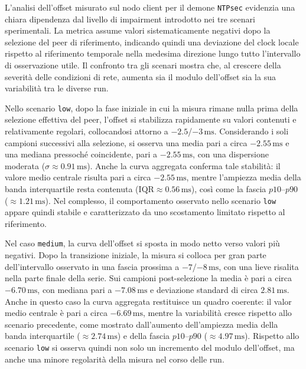 L’analisi dell’offset misurato sul nodo client per il demone \texttt{NTPsec} evidenzia
una chiara dipendenza dal livello di impairment introdotto nei tre scenari sperimentali.
La metrica assume valori sistematicamente negativi dopo la selezione del peer di
riferimento, indicando quindi una deviazione del clock locale rispetto al riferimento
temporale nella medesima direzione lungo tutto l’intervallo di osservazione utile.
Il confronto tra gli scenari mostra che, al crescere della severità delle condizioni
di rete, aumenta sia il modulo dell’offset sia la sua variabilità tra le diverse
run.

Nello scenario \texttt{low}, dopo la fase iniziale in cui la misura rimane nulla
prima della selezione effettiva del peer, l’offset si stabilizza rapidamente su valori
contenuti e relativamente regolari, collocandosi attorno a $-2.5$/$-3\,\mathrm{ms}$.
Considerando i soli campioni successivi alla selezione, si osserva una media
pari a circa $-2.55\,\mathrm{ms}$ e una mediana pressoché coincidente, pari a $-2
.55\,\mathrm{ms}$, con una dispersione moderata ($\sigma \approx 0.91\,\mathrm{ms}$).
Anche la curva aggregata conferma tale stabilità: il valore medio centrale
risulta pari a circa $-2.55\,\mathrm{ms}$, mentre l’ampiezza media della banda interquartile
resta contenuta ($\mathrm{IQR}\approx 0.56\,\mathrm{ms}$), così come la fascia
$p10$--$p90$ ($\approx 1.21\,\mathrm{ms}$). Nel complesso, il comportamento osservato
nello scenario \texttt{low} appare quindi stabile e caratterizzato da uno
scostamento limitato rispetto al riferimento.

Nel caso \texttt{medium}, la curva dell’offset si sposta in modo netto verso
valori più negativi. Dopo la transizione iniziale, la misura si colloca per gran
parte dell’intervallo osservato in una fascia prossima a $-7$/$-8\,\mathrm{ms}$, con
una lieve risalita nella parte finale della serie. Sui campioni post-selezione
la media è pari a circa $-6.70\,\mathrm{ms}$, con mediana pari a $-7.08\,\mathrm{ms}$
e deviazione standard di circa $2.81\,\mathrm{ms}$. Anche in questo caso la
curva aggregata restituisce un quadro coerente: il valor medio centrale è pari a circa
$-6.69\,\mathrm{ms}$, mentre la variabilità cresce rispetto allo scenario
precedente, come mostrato dall’aumento dell’ampiezza media della banda interquartile
($\approx 2.74\,\mathrm{ms}$) e della fascia $p10$--$p90$ ($\approx 4.97\,\mathrm{ms}$).
Rispetto allo scenario \texttt{low} si osserva quindi non solo un incremento del
modulo dell’offset, ma anche una minore regolarità della misura nel corso delle run.


